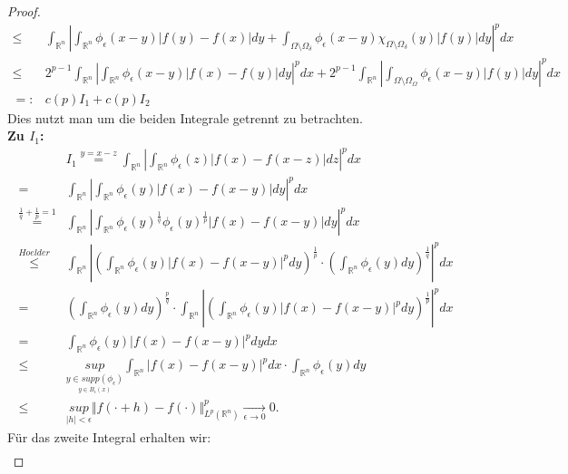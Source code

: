 \documentclass[12pt,titlepage]{article}
\numberwithin{equation}{section}
\begin{document}
\begin{proof}
\begin{align*}
\leq  &\int_{\mathbb{R}^n}\left\vert\int_{\mathbb{R}^n}\phi_{\epsilon}(x-y)\vert f(y)-f(x)\vert dy+\int_{\Omega\setminus \Omega_{\delta}}\phi_{\epsilon}(x-y)\chi_{\Omega\setminus \Omega_{\delta}}(y)\vert f(y) \vert dy \right\vert^p dx\\
\leq & 2^{p-1}\int_{\mathbb{R}^n}\left\vert \int_{\mathbb{R}^n} \phi_{\epsilon}(x-y)\vert f(x)-f(y) \vert dy \right\vert^pdx + 2^{p-1}\int_{\mathbb{R}^n}\left\vert \int_{\Omega\setminus \Omega_{\Omega}} \phi_{\epsilon}(x-y)\vert f(y)\vert dy \right\vert^p dx \\
=:&c(p) I_1+c(p)I_2
\end{align*} 
Dies nutzt man um die beiden Integrale getrennt zu betrachten.\\
\textbf{Zu $I_1$:}\\
\begin{align*}
&I_1 \overset{y=x-z}{=}\int_{\mathbb{R}^n}\left\vert \int_{\mathbb{R}^n} \phi_{\epsilon}(z)\vert f(x)-f(x-z)  \vert dz \right\vert^pdx\\
=&\int_{\mathbb{R}^n}\left\vert \int_{\mathbb{R}^n} \phi_{\epsilon}(y)\vert f(x)-f(x-y) \vert dy  \right\vert^pdx\\
\overset{\frac{1}{q}+\frac{1}{p}=1}{=}&\int_{\mathbb{R}^n}\left\vert \int_{\mathbb{R}^n} \phi_{\epsilon}(y)^{\frac{1}{q}}\phi_{\epsilon}(y)^{\frac{1}{p}}\vert f(x)-f(x-y)  \vert dy \right\vert^pdx\\
\overset{Hoelder}{\leq}&\int_{\mathbb{R}^n}\left\vert \left(\int_{\mathbb{R}^n}\phi_{\epsilon}(y)\vert f(x)-f(x-y)  \vert^p dy \right)^{\frac{1}{p}}\cdot\left(\int_{\mathbb{R}^n} \phi_{\epsilon}(y)dy\right)^{\frac{1}{q}}\right\vert^{p}  dx\\
=&\left(\int_{\mathbb{R}^n} \phi_{\epsilon}(y)dy\right)^{\frac{p}{q}}\cdot \int_{\mathbb{R}^n}\left\vert \left(\int_{\mathbb{R}^n}\phi_{\epsilon}(y)\vert f(x)-f(x-y)  \vert^p dy \right)^{\frac{1}{p}}\right\vert^{p}  dx\\
=&\int_{\mathbb{R}^n}\phi_{\epsilon}(y)\vert f(x)-f(x-y)  \vert^p dy  dx\\
\leq &\underset{\underset{y\in B_{\epsilon}(x)}{y \in supp(\phi_{\epsilon})}}{sup}\int_{\mathbb{R}^n} \vert f(x)-f(x-y)\vert^p dx \cdot\int_{\mathbb{R}^n}\phi_{\epsilon}(y) dy \\
\leq &\underset{\vert h\vert < \epsilon}{sup} \Vert f(\cdot + h)-f(\cdot)\Vert_{L^p(\mathbb{R}^n)}^p\underset{\epsilon \rightarrow 0}{\rightarrow}0. 
\end{align*}
Für das zweite Integral erhalten wir:
\begin{align*}

\end{align*}
\end{proof}
\end{document}
